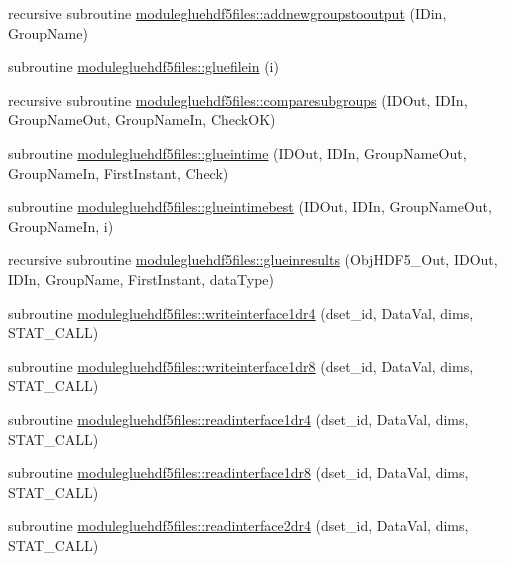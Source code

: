 \begin{DoxyCompactItemize}
\item 
recursive subroutine \mbox{\hyperlink{namespacemodulegluehdf5files_adf08cc960a9d299d5f221e46c1ec20bd}{modulegluehdf5files\+::addnewgroupstooutput}} (I\+Din, Group\+Name)
\item 
subroutine \mbox{\hyperlink{namespacemodulegluehdf5files_a102906b766caaf9abc74b0c0de97ab0c}{modulegluehdf5files\+::gluefilein}} (i)
\item 
recursive subroutine \mbox{\hyperlink{namespacemodulegluehdf5files_aeacbdb79a83691a90c236da51ac23775}{modulegluehdf5files\+::comparesubgroups}} (I\+D\+Out, I\+D\+In, Group\+Name\+Out, Group\+Name\+In, Check\+OK)
\item 
subroutine \mbox{\hyperlink{namespacemodulegluehdf5files_af9077091d4ab6580969f5d961ccc9b22}{modulegluehdf5files\+::glueintime}} (I\+D\+Out, I\+D\+In, Group\+Name\+Out, Group\+Name\+In, First\+Instant, Check)
\item 
subroutine \mbox{\hyperlink{namespacemodulegluehdf5files_a58aecafa3c64f2f6546b818404f30b15}{modulegluehdf5files\+::glueintimebest}} (I\+D\+Out, I\+D\+In, Group\+Name\+Out, Group\+Name\+In, i)
\item 
recursive subroutine \mbox{\hyperlink{namespacemodulegluehdf5files_a3433c6674efedbc9d8386001b56ecbfd}{modulegluehdf5files\+::glueinresults}} (Obj\+H\+D\+F5\+\_\+\+Out, I\+D\+Out, I\+D\+In, Group\+Name, First\+Instant, data\+Type)
\item 
subroutine \mbox{\hyperlink{namespacemodulegluehdf5files_a6eedc150fe0ffbc5acbf71f7281bad4e}{modulegluehdf5files\+::writeinterface1dr4}} (dset\+\_\+id, Data\+Val, dims, S\+T\+A\+T\+\_\+\+C\+A\+LL)
\item 
subroutine \mbox{\hyperlink{namespacemodulegluehdf5files_a4828bbbb17a4c4d536a11e4a4c1c719b}{modulegluehdf5files\+::writeinterface1dr8}} (dset\+\_\+id, Data\+Val, dims, S\+T\+A\+T\+\_\+\+C\+A\+LL)
\item 
subroutine \mbox{\hyperlink{namespacemodulegluehdf5files_aa4ca3b87506cf4d1f6d0a509d189116b}{modulegluehdf5files\+::readinterface1dr4}} (dset\+\_\+id, Data\+Val, dims, S\+T\+A\+T\+\_\+\+C\+A\+LL)
\item 
subroutine \mbox{\hyperlink{namespacemodulegluehdf5files_a1b5be0395974808f570b4d4721230b84}{modulegluehdf5files\+::readinterface1dr8}} (dset\+\_\+id, Data\+Val, dims, S\+T\+A\+T\+\_\+\+C\+A\+LL)
\item 
subroutine \mbox{\hyperlink{namespacemodulegluehdf5files_aac62a4c40cdd50f31e9b2a371111b634}{modulegluehdf5files\+::readinterface2dr4}} (dset\+\_\+id, Data\+Val, dims, S\+T\+A\+T\+\_\+\+C\+A\+LL)

\end{DoxyCompactItemize}
